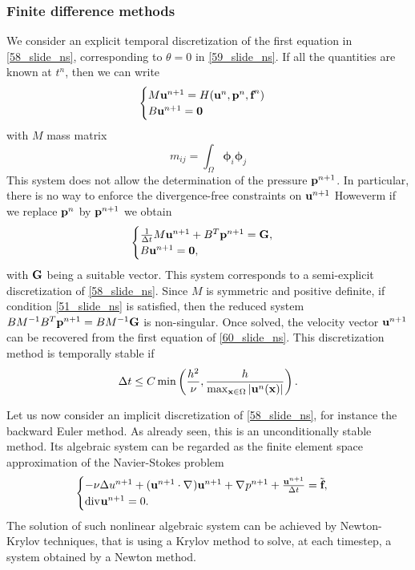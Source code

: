 \subsubsection*{Finite difference methods}
We consider an explicit temporal discretization of the first equation in \eqref{58_slide_ns}, corresponding to \(\theta = 0\) in \eqref{59_slide_ns}. If all the quantities are known at \(t^n\), then we can write
\begin{equation*}
    \begin{cases}
        M\textbf{u}^{n+1} = H(\textbf{u}^n, \textbf{p}^n,\textbf{f}^n) \\
        B\textbf{u}^{n+1} =\textbf{0}
    \end{cases}
\end{equation*}
with \(M\) mass matrix 
\[
    m_{ij} = \int_\Omega \bm{\phi}_i \bm{\phi}_j
\]
This system does not allow the determination of the pressure \(\textbf{p}^{n+1}\). In particular, there is no way to enforce the divergence-free constraints on \(\textbf{u}^{n+1}\) Howeverm if we replace \(\textbf{p}^n\) by \(\textbf{p}^{n+1}\) we obtain 
\begin{equation}
    \begin{cases}
        \frac{1}{\Delta t} M \textbf{u}^{n+1} + B^T\textbf{p}^{n+1} = \textbf{G}, \\
        B\textbf{u}^{n+1} = \textbf{0} ,
    \end{cases}
    \label{60_slide_ns}
\end{equation}
with \(\textbf{G}\) being a suitable vector. This system corresponds to a semi-explicit discretization of \eqref{58_slide_ns}. Since \(M\) is symmetric and positive definite, if condition \eqref{51_slide_ns} is satisfied, then the reduced system \(BM^{-1}B^T \textbf{p}^{n+1} = BM^{-1}\textbf{G}\) is non-singular. Once solved, the velocity vector \(\textbf{u}^{n+1}\) can be recovered from the first equation of \eqref{60_slide_ns}. This discretization method is temporally stable if 
\[
    \Delta t \leq C\min\left( \frac{h^2}{\nu}, \frac{h}{\max_{\textbf{x}\in\Omega}\abs{\textbf{u}^n(\textbf{x})}} \right).
\]

Let us now consider an implicit discretization of \eqref{58_slide_ns}, for instance the backward Euler method. As already seen, this is an unconditionally stable method. Its algebraic system can be regarded as the finite element space approximation of the Navier-Stokes problem 
\begin{equation*}
    \begin{cases}
        -\nu\Delta u^{n+1} + (\textbf{u}^{n+1} \cdot \nabla\mspace{1mu})\textbf{u}^{n+1} + \nabla\mspace{1mu} p^{n+1} + \frac{\textbf{u}^{n+1}}{\Delta t} = \tilde{\textbf{f}}, \\
        \text{div}\mspace{1mu} \textbf{u}^{n+1} = 0.
    \end{cases}
\end{equation*}
The solution of such nonlinear algebraic system can be achieved by Newton-Krylov techniques, that is using a Krylov method to solve, at each timestep, a system obtained by a Newton method.

